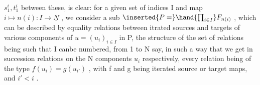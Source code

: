 $s_1^i , t_1^i$ between these, is clear:  for a given set of indices I and map
$i \mapsto n(i) : I \to \underline{N}$ , we consider a sub $\inserted{P=}\hand{\prod_{i\in I}}F_{n(i)}$ ,  which can be
described by equality relations between itrated sources and targets
 of various components of $u = (u_i)_{i\in I}$  in P,  the structure of
the set of relations being such that I can\hand{\unsure{,}}be numbered, from 1 to N say,
in such a way that we get in succession  relations on the N components
$u_i$ respectively, every relation being of the type $f(u_i) = g(u_{i'})$ , with
f and g being iterated source or target maps, and $i'<i$ . 

